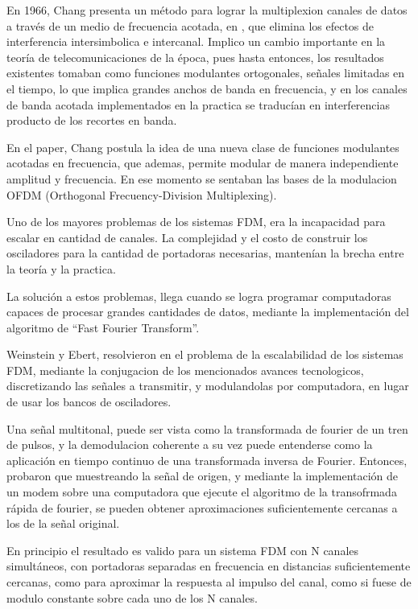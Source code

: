 En 1966, Chang presenta un método para lograr la multiplexion canales de datos a través de un medio de frecuencia acotada, en \cite{chang-ofdm}, que elimina los efectos de interferencia intersimbolica e intercanal. Implico un cambio importante en la teoría de telecomunicaciones de la época, pues hasta entonces, los resultados existentes tomaban como funciones modulantes ortogonales, señales limitadas en el tiempo, lo que implica grandes anchos de banda en frecuencia, y en los canales de banda acotada implementados en la practica se traducían en interferencias producto de los recortes en banda. 

En el paper, Chang postula la idea de una nueva clase de funciones modulantes acotadas en frecuencia, que ademas, permite modular de manera independiente amplitud y frecuencia. En ese momento se sentaban las bases de la modulacion OFDM (Orthogonal Frecuency-Division Multiplexing).

Uno de los mayores problemas de los sistemas FDM, era la incapacidad para escalar en cantidad de canales. La complejidad y el costo de construir los osciladores para la cantidad de portadoras necesarias, mantenían la brecha entre la teoría y la practica. 

La solución a estos problemas, llega cuando se logra programar computadoras capaces de procesar grandes cantidades de datos, mediante la implementación del algoritmo de “Fast Fourier Transform”. 

Weinstein y Ebert, resolvieron en \cite{discrete-ofdm} el problema de la escalabilidad de los sistemas FDM, mediante la conjugacion de los mencionados avances tecnologicos, discretizando las señales a transmitir, y modulandolas por computadora, en lugar de usar los bancos de osciladores. 

Una señal multitonal, puede ser vista como la transformada de fourier de un tren de pulsos, y la demodulacion coherente a su vez puede entenderse como la aplicación en tiempo continuo de una transformada inversa de Fourier. Entonces, probaron que muestreando la señal de origen, y mediante la implementación de un modem sobre una computadora que ejecute el algoritmo de la transofrmada rápida de fourier, se pueden obtener aproximaciones suficientemente cercanas a los de la señal original. 

En principio el resultado es valido para un sistema FDM con N canales simultáneos, con portadoras separadas en frecuencia en distancias suficientemente cercanas, como para aproximar la respuesta al impulso del canal, como si fuese de modulo constante sobre cada uno de los N canales. 

